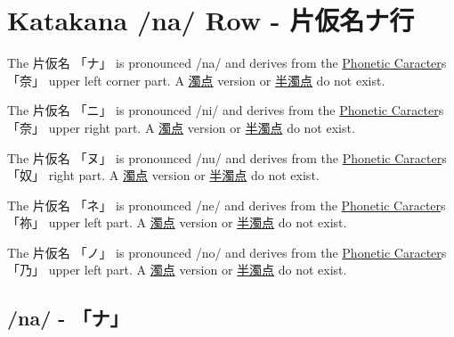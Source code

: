 \section{Katakana /na/ Row - 片仮名ナ行}\label{sec:KatakanaNaRow}


\label{letter:na} The  片仮名 {「ナ」} is pronounced  /na/ and  derives from the
\hyperref[sec:PhoneticCharacter]{Phonetic Caracter}s {「奈」} upper left corner part.
A \hyperref[sec:Dakuten]{濁点} version  or \hyperref[sec:Handakuten]{半濁点} do
not exist.

\label{letter:ni} The  片仮名 {「ニ」} is pronounced  /ni/ and  derives from the
\hyperref[sec:PhoneticCharacter]{Phonetic Caracter}s {「奈」} upper right part.
A \hyperref[sec:Dakuten]{濁点} version  or \hyperref[sec:Handakuten]{半濁点} do
not exist.

\label{letter:nu} The  片仮名 {「ヌ」} is pronounced  /nu/ and  derives from the
\hyperref[sec:PhoneticCharacter]{Phonetic Caracter}s {「奴」} right part.
A \hyperref[sec:Dakuten]{濁点} version  or \hyperref[sec:Handakuten]{半濁点} do
not exist.



\newpage

\label{letter:ne} The  片仮名 {「ネ」} is pronounced  /ne/ and  derives from the
\hyperref[sec:PhoneticCharacter]{Phonetic Caracter}s {「祢」} upper left  part.
A \hyperref[sec:Dakuten]{濁点} version  or \hyperref[sec:Handakuten]{半濁点} do
not exist.

\label{letter:no} The  片仮名 {「ノ」} is pronounced  /no/ and  derives from the
\hyperref[sec:PhoneticCharacter]{Phonetic Caracter}s {「乃」} upper left part.
A \hyperref[sec:Dakuten]{濁点} version  or \hyperref[sec:Handakuten]{半濁点} do
not exist.


\newpage

\subsection{/na/ - 「ナ」} \label{sec:KatakanaNa}

 

